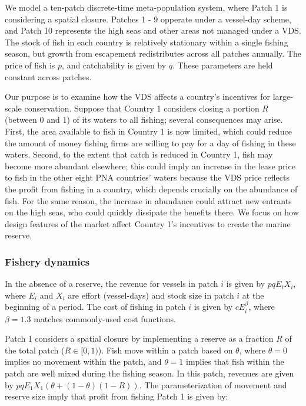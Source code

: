 \documentclass[12pt]{article}
\begin{document}
We model a ten-patch discrete-time meta-population system, where Patch 1 is considering a spatial closure. Patches 1 - 9 opperate under a vessel-day scheme, and Patch 10 represents the high seas and other areas not managed under a VDS. The stock of fish in each country is relatively stationary within a single fishing season, but  growth from escapement redistributes across all patches annually. The price of fish is $p$, and catchability is given by $q$. These parameters are held constant across patches.

Our purpose is to examine how the VDS affects a country's incentives for large-scale conservation. Suppose that Country 1 considers closing a portion $R$ (between 0 and 1) of its waters to all fishing; several consequences may arise. First, the area available to fish in Country 1 is now limited, which could reduce the amount of money fishing firms are willing to pay for a day of fishing in these waters. Second, to the extent that catch is reduced in Country 1, fish may become more abundant elsewhere; this could imply an increase in the lease price to fish in the other eight PNA countries' waters because the VDS price reflects the profit from fishing in a country, which depends crucially on the abundance of fish. For the same reason, the increase in abundance could attract new entrants on the high seas, who could quickly dissipate the benefits there. We focus on how design features of the market affect Country 1's incentives to create the marine reserve.

\subsubsection{Fishery dynamics}

In the absence of a reserve, the revenue for vessels in patch $i$ is given by $pqE_iX_i$, where $E_i$ and $X_i$ are effort (vessel-days) and stock size in patch $i$ at the beginning of a period. The cost of fishing in patch $i$ is given by $cE_i^\beta$, where $\beta = 1.3$ matches commonly-used cost functions.

Patch 1 considers a spatial closure by implementing a reserve as a fraction $R$ of the total patch ($R \in[0,1)$). Fish move within a patch based on $\theta$, where $\theta = 0$ implies no movement within the patch, and $\theta = 1$ implies that fish within the patch are well mixed during the fishing season. In this patch, revenues are given by $pqE_1X_1(\theta + (1 - \theta)(1 - R))$. The parameterization of movement and reserve size imply that profit from fishing Patch 1 is given by:
\end{document}
